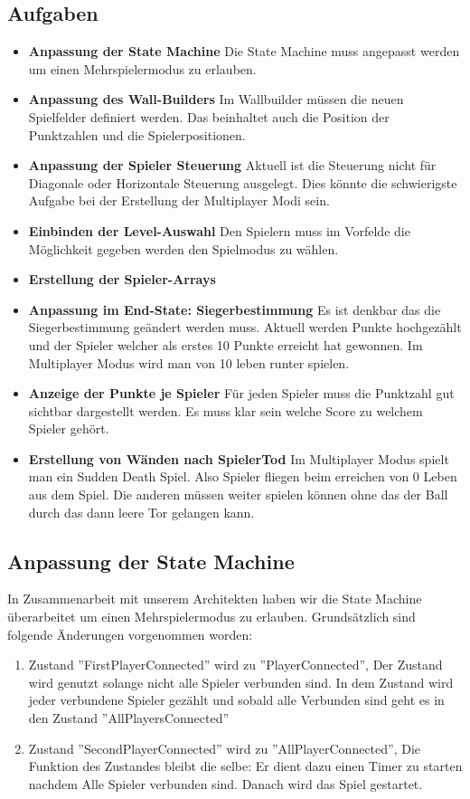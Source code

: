 \subsection{Aufgaben}
\begin{itemize}
	\item
	\textbf{Anpassung der State Machine}
	\newline
	Die State Machine muss angepasst werden um einen Mehrspielermodus zu erlauben.
	\item
	\textbf{Anpassung des Wall-Builders}
	Im Wallbuilder müssen die neuen Spielfelder definiert werden. Das beinhaltet auch die Position der Punktzahlen und die Spielerpositionen.
	\item
	\textbf{Anpassung der Spieler Steuerung}
	Aktuell ist die Steuerung nicht für Diagonale oder Horizontale Steuerung ausgelegt. Dies könnte die schwierigste Aufgabe bei der Erstellung der Multiplayer Modi sein.
	\item
	\textbf{Einbinden der Level-Auswahl}
	Den Spielern muss im Vorfelde die Möglichkeit gegeben werden den Spielmodus zu wählen.
	\item
	\textbf{Erstellung der Spieler-Arrays}
	\item
	\textbf{Anpassung im End-State: Siegerbestimmung}
	Es ist denkbar das die Siegerbestimmung geändert werden muss. Aktuell werden Punkte hochgezählt und der Spieler welcher als erstes 10 Punkte erreicht hat gewonnen. Im Multiplayer Modus wird man von 10 leben runter spielen.
	\item
	\textbf{Anzeige der Punkte je Spieler}
	Für jeden Spieler muss die Punktzahl gut sichtbar dargestellt werden. Es muss klar sein welche Score zu welchem Spieler gehört.
	\item
	\textbf{Erstellung von Wänden nach SpielerTod}
	Im Multiplayer Modus spielt man ein Sudden Death Spiel. Also Spieler fliegen beim erreichen von 0 Leben aus dem Spiel. Die anderen müssen weiter spielen können ohne das der Ball durch das dann leere Tor gelangen kann.
\end{itemize}
\subsection{Anpassung der State Machine}
In Zusammenarbeit mit unserem Architekten haben wir die State Machine überarbeitet um einen Mehrspielermodus zu erlauben.
\newline
Grundsätzlich sind folgende Änderungen vorgenommen worden:
\begin{enumerate}
	\item 
	Zustand ''FirstPlayerConnected'' wird zu ''PlayerConnected'',
	\newline
	Der Zustand wird genutzt solange nicht alle Spieler verbunden sind. In dem Zustand wird jeder verbundene Spieler gezählt und sobald alle Verbunden sind geht es in den Zustand ''AllPlayersConnected''
	\item
	Zustand ''SecondPlayerConnected'' wird zu ''AllPlayerConnected'',
	\newline
	Die Funktion des Zustandes bleibt die selbe: Er dient dazu einen Timer zu starten nachdem Alle Spieler verbunden sind. Danach wird das Spiel gestartet.
\end{enumerate}
